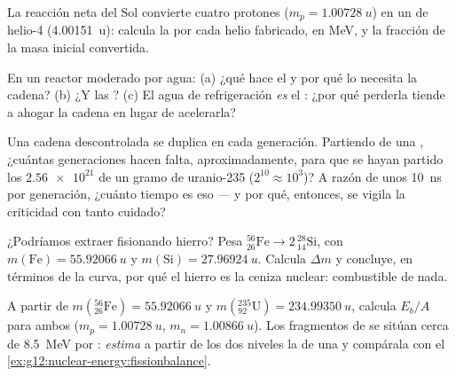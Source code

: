 \begin{exercise}[$\star\star$]\label{exo:g12:nuclear-energy:10}
La reacción neta del Sol convierte cuatro protones ($m_p = \qty{1.00728}{u}$) en un
 de helio-4 (\qty{4.00151}{u}): calcula la  por cada helio fabricado, en
\unit{MeV}, y la fracción de la masa inicial convertida.
\end{exercise}

\begin{exercise}[$\star\star$]\label{exo:g12:nuclear-energy:11}
En un reactor moderado por agua: (a) ¿qué hace el  y por qué lo necesita la
cadena? (b) ¿Y las ? (c) El agua de refrigeración \emph{es} el
: ¿por qué perderla tiende a ahogar la cadena en lugar de acelerarla?
\end{exercise}

\begin{exercise}[$\star\star\star$]\label{exo:g12:nuclear-energy:12}
Una cadena descontrolada se duplica en cada generación. Partiendo de una , ¿cuántas
generaciones hacen falta, aproximadamente, para que se hayan partido los
$\num{2.56e21}$  de un gramo de uranio-235 ($2^{10} \approx 10^{3}$)? A razón
de unos \qty{10}{ns} por generación, ¿cuánto tiempo es eso --- y por qué, entonces, se
vigila la criticidad con tanto cuidado?
\end{exercise}

\begin{exercise}[$\star\star\star$]\label{exo:g12:nuclear-energy:13}
¿Podríamos extraer  fisionando hierro? Pesa
${}^{56}_{26}\mathrm{Fe} \to 2\,{}^{28}_{14}\mathrm{Si}$, con
$m(\mathrm{Fe}) = \qty{55.92066}{u}$ y $m(\mathrm{Si}) = \qty{27.96924}{u}$. Calcula
$\Delta m$ y concluye, en términos de la curva, por qué el hierro es la ceniza
nuclear: combustible de nada.
\end{exercise}

\begin{exercise}[$\star\star\star$]\label{exo:g12:nuclear-energy:14}
A partir de $m({}^{56}_{26}\mathrm{Fe}) = \qty{55.92066}{u}$ y
$m({}^{235}_{92}\mathrm{U}) = \qty{234.99350}{u}$, calcula $E_b/A$ para ambos
($m_p = \qty{1.00728}{u}$, $m_n = \qty{1.00866}{u}$). Los fragmentos de  se
sitúan cerca de \qty{8.5}{MeV} por : \emph{estima} a partir de los dos niveles
la  de una  y compárala con el
\cref{ex:g12:nuclear-energy:fissionbalance}.
\end{exercise}

